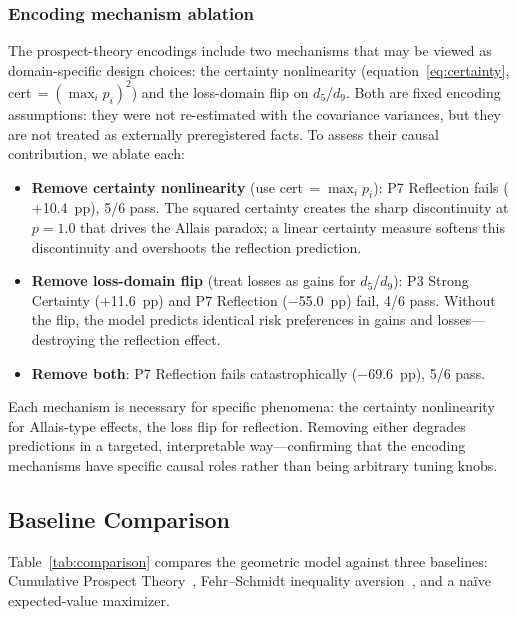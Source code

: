 \documentclass[journal]{IEEEtran}
\begin{document}
\subsubsection{Encoding mechanism ablation}
The prospect-theory encodings include two mechanisms that may be viewed as domain-specific design choices: the certainty nonlinearity (equation~\eqref{eq:certainty}, cert\,$= (\max_i p_i)^2$) and the loss-domain flip on $d_5$/$d_9$.
Both are fixed encoding assumptions: they were not re-estimated with the covariance variances, but they are not treated as externally preregistered facts.
To assess their causal contribution, we ablate each:
\begin{itemize}
    \item \textbf{Remove certainty nonlinearity} (use cert\,$= \max_i p_i$): P7 Reflection fails ($+$10.4~pp), 5/6 pass.
    The squared certainty creates the sharp discontinuity at $p = 1.0$ that drives the Allais paradox; a linear certainty measure softens this discontinuity and overshoots the reflection prediction.
    \item \textbf{Remove loss-domain flip} (treat losses as gains for $d_5$/$d_9$): P3 Strong Certainty ($+$11.6~pp) and P7 Reflection ($-$55.0~pp) fail, 4/6 pass.
    Without the flip, the model predicts identical risk preferences in gains and losses---destroying the reflection effect.
    \item \textbf{Remove both}: P7 Reflection fails catastrophically ($-$69.6~pp), 5/6 pass.
\end{itemize}
Each mechanism is necessary for specific phenomena: the certainty nonlinearity for Allais-type effects, the loss flip for reflection.
Removing either degrades predictions in a targeted, interpretable way---confirming that the encoding mechanisms have specific causal roles rather than being arbitrary tuning knobs.

\subsection{Baseline Comparison}

Table~\ref{tab:comparison} compares the geometric model against three baselines: Cumulative Prospect Theory~\cite{tversky1992}, Fehr--Schmidt inequality aversion~\cite{fehr1999}, and a na\"ive expected-value maximizer.
\end{document}
